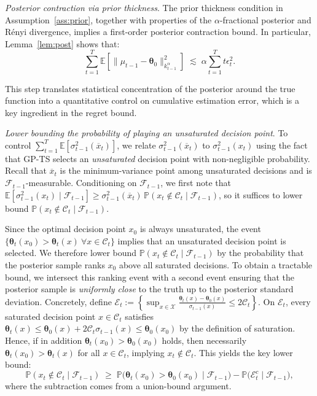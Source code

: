 \documentclass[final,12pt]{colt2026} %
\begin{document}
\medskip
\noindent\textit{Posterior contraction via prior thickness}.
The prior thickness condition in Assumption~\ref{ass:prior}, together with properties of the $\alpha$-fractional posterior and R\'enyi divergence, implies a first-order posterior contraction bound. In particular, Lemma~\ref{lem:post} shows that:
\[
\sum_{t=1}^T \mathbb{E}\!\left[\|\mu_{t-1}-\pmb\theta_0\|_{k_{t-1}^\alpha}^2\right]
\;\lesssim\;\alpha
\sum_{t=1}^T t\epsilon_t^2.
\]

This step translates statistical concentration of the posterior around the true function into a quantitative control on cumulative estimation error, which is a key ingredient in the regret bound.

\medskip
\noindent\textit{Lower bounding the probability of playing an unsaturated decision point}.
To control $\sum_{t=1}^T \mathbb{E}[\sigma_{t-1}^2(\overline{x}_t)]$, we relate $\sigma_{t-1}^2(\overline{x}_t)$ to $\sigma_{t-1}^2(x_t)$ using the fact that GP-TS selects an \emph{unsaturated} decision point with non-negligible probability. Recall that $\overline{x}_t$ is the minimum-variance point among unsaturated decisions and is $\mathcal{F}_{t-1}$-measurable. Conditioning on $\mathcal{F}_{t-1}$, we first note that
$\mathbb{E}[\sigma_{t-1}^2(x_t)\mid\mathcal{F}_{t-1}]
\ge \sigma_{t-1}^2(\overline{x}_t)\,\mathbb{P}(x_t\notin\mathcal{C}_t\mid\mathcal{F}_{t-1})$,
so it suffices to lower bound $\mathbb{P}(x_t\notin\mathcal{C}_t\mid\mathcal{F}_{t-1})$.

Since the optimal decision point $x_0$ is always unsaturated, the event $\{\pmb\theta_t(x_0)>\pmb\theta_t(x)\ \forall x\in\mathcal{C}_t\}$ implies that an unsaturated decision point is selected. We therefore lower bound
$\mathbb{P}(x_t\notin\mathcal{C}_t\mid\mathcal{F}_{t-1})$
by the probability that the posterior sample ranks $x_0$ above all saturated decisions. To obtain a tractable bound, we intersect this ranking event with a second event ensuring that the posterior sample is \emph{uniformly close} to the truth up to the posterior standard deviation. Concretely, define
$\mathcal{E}_t := \left\{\sup_{x\in\mathcal{X}} \frac{\pmb\theta_t(x)-\pmb\theta_0(x)}{\sigma_{t-1}(x)} \le 2\mathcal{C}_t\right\}$.
On $\mathcal{E}_t$, every saturated decision point $x\in\mathcal{C}_t$ satisfies
$\pmb\theta_t(x) \le \pmb\theta_0(x)+2\mathcal{C}_t\sigma_{t-1}(x)
\le \pmb\theta_0(x_0)$
by the definition of saturation. Hence, if in addition $\pmb\theta_t(x_0)>\pmb\theta_0(x_0)$ holds, then necessarily $\pmb\theta_t(x_0)>\pmb\theta_t(x)$ for all $x\in\mathcal{C}_t$, implying $x_t\notin\mathcal{C}_t$. This yields the key lower bound:
\[
\mathbb{P}(x_t\notin\mathcal{C}_t\mid\mathcal{F}_{t-1})
\;\ge\;
\mathbb{P}\big(\pmb\theta_t(x_0)>\pmb\theta_0(x_0)\mid\mathcal{F}_{t-1}\big)
-
\mathbb{P}\big(\mathcal{E}_t^{c}\mid\mathcal{F}_{t-1}\big),
\]
where the subtraction comes from a union-bound argument.
\end{document}
